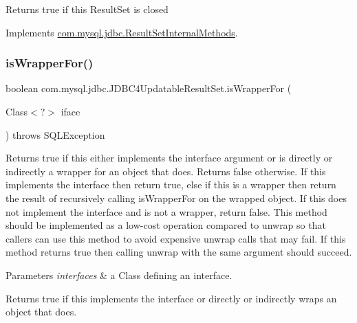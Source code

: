 Returns true if this Result\+Set is closed 

Implements \mbox{\hyperlink{interfacecom_1_1mysql_1_1jdbc_1_1_result_set_internal_methods_ab7d1d10caf4c61a3472928f695361c24}{com.\+mysql.\+jdbc.\+Result\+Set\+Internal\+Methods}}.

\mbox{\label{classcom_1_1mysql_1_1jdbc_1_1_j_d_b_c4_updatable_result_set_a550bdf2d1e3a3f3a6d032c50601c0c89}} 
\subsubsection{\texorpdfstring{is\+Wrapper\+For()}{isWrapperFor()}}
{\footnotesize\ttfamily boolean com.\+mysql.\+jdbc.\+J\+D\+B\+C4\+Updatable\+Result\+Set.\+is\+Wrapper\+For (\begin{DoxyParamCaption}\item[{Class$<$?$>$}]{iface }\end{DoxyParamCaption}) throws S\+Q\+L\+Exception}

Returns true if this either implements the interface argument or is directly or indirectly a wrapper for an object that does. Returns false otherwise. If this implements the interface then return true, else if this is a wrapper then return the result of recursively calling {\ttfamily is\+Wrapper\+For} on the wrapped object. If this does not implement the interface and is not a wrapper, return false. This method should be implemented as a low-\/cost operation compared to {\ttfamily unwrap} so that callers can use this method to avoid expensive {\ttfamily unwrap} calls that may fail. If this method returns true then calling {\ttfamily unwrap} with the same argument should succeed.


\begin{DoxyParams}{Parameters}
{\em interfaces} & a Class defining an interface. \\
\hline
\end{DoxyParams}
\begin{DoxyReturn}{Returns}
true if this implements the interface or directly or indirectly wraps an object that does. 
\end{DoxyReturn}

